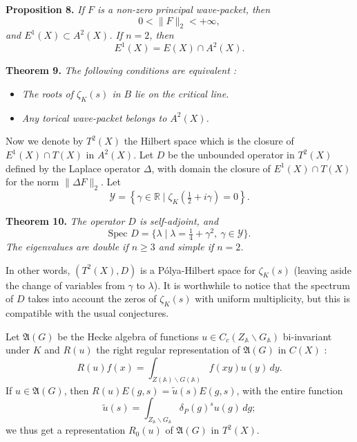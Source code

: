 \documentclass[12pt]{article}
\begin{document}
\medskip

\noindent
\textbf{Proposition 8.} \emph{If $F$ is a non-zero principal wave-packet, then}
\[
0 < \|F\|_{2} < +\infty,
\]
\emph{and $E^{1}(X) \subset A^{2}(X)$. If $n = 2$, then}
\[
E^{1}(X) = E(X) \cap A^{2}(X).
\]

\medskip

\noindent
\textbf{Theorem 9.} \emph{The following conditions are equivalent :}
\begin{itemize}
\item[(i)] \emph{The roots of $\zeta_{K}(s)$ in $B$ lie on the critical line.}
\item[(ii)] \emph{Any torical wave-packet belongs to $A^{2}(X)$.}
\end{itemize}

\medskip

Now we denote by $T^{2}(X)$ the Hilbert space which is the closure of $E^{1}(X) \cap T(X)$ in $A^{2}(X)$. Let $D$ be the unbounded operator in $T^{2}(X)$ defined by the Laplace operator $\Delta$, with domain the closure of $E^{1}(X) \cap T(X)$ for the norm $\|\Delta F\|_{2}$. Let
\[
\mathcal{Y} = \left\{ \gamma \in \mathbb{R} \mid \zeta_{K}\left(\tfrac{1}{2} + i\gamma\right) = 0 \right\}.
\]

\medskip

\noindent
\textbf{Theorem 10.} \emph{The operator $D$ is self-adjoint, and}
\[
\text{Spec } D = \{ \lambda \mid \lambda = \tfrac{1}{4} + \gamma^{2},\ \gamma \in \mathcal{Y} \}.
\]
\emph{The eigenvalues are double if $n \geq 3$ and simple if $n = 2$.}

\medskip

In other words, $(T^{2}(X), D)$ is a Pólya-Hilbert space for $\zeta_{K}(s)$ (leaving aside the change of variables from $\gamma$ to $\lambda$). It is worthwhile to notice that the spectrum of $D$ takes into account the zeros of $\zeta_{K}(s)$ with uniform multiplicity, but this is compatible with the usual conjectures.

Let $\mathfrak{A}(G)$ be the Hecke algebra of functions $u \in C_{c}(Z_{\mathbb{A}} \backslash G_{\mathbb{A}})$ bi-invariant under $K$ and $R(u)$ the right regular representation of $\mathfrak{A}(G)$ in $C(X)$ :
\[
R(u)f(x) = \int_{Z(\mathbb{A}) \backslash G(\mathbb{A})} f(xy) u(y)\,dy.
\]
If $u \in \mathfrak{A}(G)$, then $R(u)E(g, s) = \tilde{u}(s)E(g, s)$, with the entire function
\[
\tilde{u}(s) = \int_{Z_{\mathbb{A}} \backslash G_{\mathbb{A}}} \delta_{P}(g)^{s} u(g)\,dg ;
\]
we thus get a representation $R_{0}(u)$ of $\mathfrak{A}(G)$ in $T^{2}(X)$.
\end{document}

